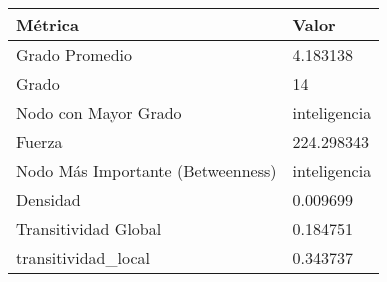 \begin{tabular}{ll}
\toprule
Métrica & Valor \\
\midrule
Grado Promedio & 4.183138 \\
Grado & 14 \\
Nodo con Mayor Grado & inteligencia \\
Fuerza & 224.298343 \\
Nodo Más Importante (Betweenness) & inteligencia \\
Densidad & 0.009699 \\
Transitividad Global & 0.184751 \\
transitividad_local & 0.343737 \\
\bottomrule
\end{tabular}
